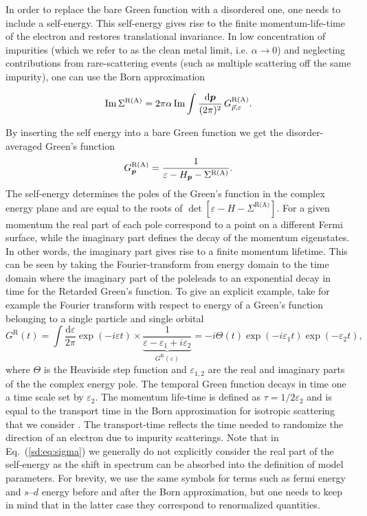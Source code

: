 In order to replace the bare Green function with a disordered one, one needs to include a self-energy. This self-energy gives rise to the finite momentum-life-time of the electron and restores translational invariance.  In low concentration of impurities (which we refer to as the clean metal limit, i.e. $\alpha\rightarrow0$) and neglecting contributions from rare-scattering events (such as multiple scattering off the same impurity), one can use the Born approximation

\begin{equation}
\operatorname{Im} \Sigma^\text{R(A)} = 2\pi\alpha \operatorname{Im} \int \frac{\mathrm{d}\boldsymbol{p}}{(2\pi)^2}\,G^\text{R(A)}_{\vec{p},\varepsilon}.
\label{sd:eq:sigma}
\end{equation}

By inserting the self energy into a bare Green function we get the disorder-averaged Green's function
\begin{equation}
	G^\text{R(A)}_{\boldsymbol{p}} = \frac{1}{\varepsilon-H_{\boldsymbol{p}}-\Sigma^\text{R(A)}}.
\end{equation}
The self-energy determines the poles of the Green's function in the complex energy plane and are equal to the roots of $\det[\varepsilon-H-\Sigma^\text{R(A)}]$. For a given momentum the real part of each pole correspond to a point on a different Fermi surface, while the imaginary part defines the decay of the momentum eigenstates. In other words, the imaginary part gives rise to a finite momentum lifetime. This can be seen by taking the Fourier-transform from energy domain to the time domain where the imaginary part of the poleleads to an exponential decay in time for the Retarded Green's function. To give an explicit example, take for example the Fourier transform with respect to energy of a Green's function belonging to a single particle and single orbital 
\begin{equation}
	G^\text{R}(t) = \int\!\frac{\mathrm{d}\varepsilon}{2\pi} \exp(-i \varepsilon t)\times\underbrace{\frac{1}{\varepsilon-\varepsilon_1+i\varepsilon_2}}_{G^\text{R}(\varepsilon)} = -i\Theta(t)\exp(-i\varepsilon_1t)\exp(-\varepsilon_2 t), 
\end{equation}
where $\Theta$ is the Heaviside step function and $\varepsilon_{1,2}$ are the real and imaginary parts of the the complex energy pole. The temporal Green function decays in time one a time scale set by $\varepsilon_2$. The momentum life-time is defined as $\tau = 1/2\varepsilon_2$ and is equal to the transport time in the Born approximation for isotropic scattering that we consider \cite{rammer_quantum_1986}. The transport-time reflects the time needed to randomize the direction of an electron due to impurity scatterings. Note that in Eq.~(\ref{sd:eq:sigma}) we generally do not explicitly consider the real part of the self-energy as the shift in spectrum can be absorbed into the definition of model parameters. For brevity, we use the same symbols for terms such as fermi energy and $s$--$d$ energy before and after the Born approximation, but one needs to keep in mind that in the latter case they correspond to renormalized quantities. 

